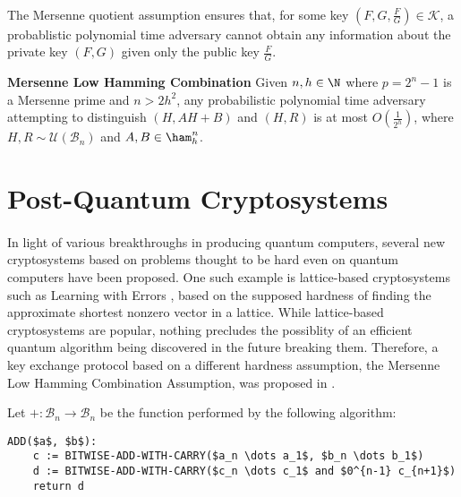 \paragraph{}
The Mersenne quotient assumption ensures that, for some key $(F, G, \frac{F}{G}) \in \mathcal{K}$, a probablistic polynomial time adversary cannot obtain any information about the private key $(F, G)$ given only the public key $\frac{F}{G}$.

\theoremstyle{definition}
\begin{definition}{\textbf{Mersenne Low Hamming Combination}}
Given $n, h \in \N$ where $p = 2^n - 1$ is a Mersenne prime and $n > 2h^2$, any probabilistic polynomial time adversary attempting to distinguish $(H, AH + B)$ and $(H, R)$ is at most $O(\frac{1}{2^h})$, where $H, R \sim \mathcal{U}(\mathcal{B}_n)$ and $A, B \in \ham_h^n$.
\end{definition}


\section{Post-Quantum Cryptosystems}
\paragraph{}
In light of various breakthroughs in producing quantum computers, several new cryptosystems based on problems thought to be hard even on quantum computers have been proposed. One such example is lattice-based cryptosystems such as Learning with Errors \cite{regev2009lattices}, based on the supposed hardness of finding the approximate shortest nonzero vector in a lattice. While lattice-based cryptosystems are popular, nothing precludes the possiblity of an efficient quantum algorithm being discovered in the future breaking them. Therefore, a key exchange protocol based on a different hardness assumption, the Mersenne Low Hamming Combination Assumption, was proposed in \cite{aggarwal2018new}.



Let $+: \mathcal{B}_n \rightarrow \mathcal{B}_n$ be the function performed by the following algorithm:
\begin{lstlisting}[mathescape=true]
ADD($a$, $b$):
    c := BITWISE-ADD-WITH-CARRY($a_n \dots a_1$, $b_n \dots b_1$)
    d := BITWISE-ADD-WITH-CARRY($c_n \dots c_1$ and $0^{n-1} c_{n+1}$)
    return d
\end{lstlisting}

